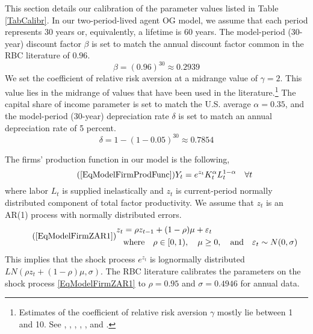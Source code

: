\documentclass[letterpaper,12pt]{article}
\theoremstyle{definition}
\newcommand\ve{\varepsilon}
\begin{document}
  This section details our calibration of the parameter values listed in Table \ref{TabCalibr}. In our two-period-lived agent OG model, we assume that each period represents 30 years or, equivalently, a lifetime is 60 years. The model-period (30-year) discount factor $\beta$ is set to match the annual discount factor common in the RBC literature of $0.96$.
  \begin{equation}\label{EqTAppCalib_beta}
    \beta = (0.96)^{30}\approx 0.2939
  \end{equation}
  We set the coefficient of relative risk aversion at a midrange value of $\gamma=2$. This value lies in the midrange of values that have been used in the literature.\footnote{Estimates of the coefficient of relative risk aversion $\gamma$ mostly lie between 1 and 10. See \citet{MankiwZeldes:1991}, \citet{Blake:1996}, \citet{Campbell:1996}, \citet{Kocherlakota:1996}, \citet{BravConstantinidesGeczy:2002}, and \citet{MehraPrescott:1985}.} The capital share of income parameter is set to match the U.S. average $\alpha=0.35$, and the model-period (30-year) depreciation rate $\delta$ is set to match an annual depreciation rate of 5 percent.
  \begin{equation}\label{EqTAppCalib_delta}
    \delta = 1 - (1 - 0.05)^{30}\approx 0.7854
  \end{equation}

  The firms' production function in our model is the following,
  \begin{equation}\tag{\ref{EqModelFirmProdFunc}}
    Y_t = e^{z_t}K_t^\alpha L_t^{1-\alpha} \quad\forall t
  \end{equation}
  where labor $L_t$ is supplied inelastically and $z_t$ is current-period normally distributed component of total factor productivity. We assume that $z_t$ is an AR(1) process with normally distributed errors.
  \begin{equation}\tag{\ref{EqModelFirmZAR1}}
    \begin{split}
      z_t &= \rho z_{t-1} + (1-\rho)\mu + \ve_t \\
      &\text{where}\quad \rho\in[0,1), \quad\mu\geq 0, \quad\text{and}\quad \ve_t \sim N(0,\sigma)
    \end{split}
  \end{equation}
  This implies that the shock process $e^{z_t}$ is lognormally distributed $LN(\rho z_t + (1-\rho)\mu,\sigma)$. The RBC literature calibrates the parameters on the shock process \eqref{EqModelFirmZAR1} to $\rho=0.95$ and $\sigma = 0.4946$ for annual data.
\end{document}

